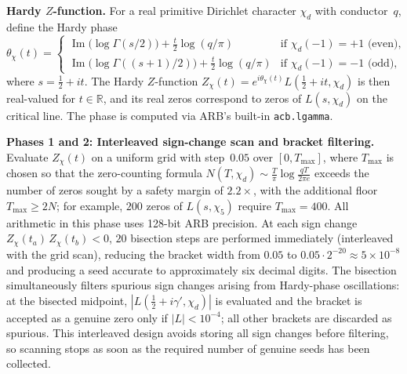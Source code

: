 \documentclass[12pt,reqno]{amsart}
\theoremstyle{plain}
\theoremstyle{definition}
\theoremstyle{remark}
\begin{document}
\medskip\noindent\textbf{Hardy $Z$-function.}  For a real primitive Dirichlet character $\chi_d$ with conductor~$q$, define the Hardy phase
\[
  \theta_\chi(t) =
  \begin{cases}
    \operatorname{Im}\!\bigl(\log\Gamma(s/2)\bigr) + \tfrac{t}{2}\log(q/\pi)
    & \text{if } \chi_d(-1) = +1 \text{ (even)}, \\[4pt]
    \operatorname{Im}\!\bigl(\log\Gamma((s{+}1)/2)\bigr) + \tfrac{t}{2}\log(q/\pi)
    & \text{if } \chi_d(-1) = -1 \text{ (odd)},
  \end{cases}
\]
where $s = \tfrac{1}{2} + it$.  The Hardy $Z$-function $Z_\chi(t) = e^{i\theta_\chi(t)} L(\tfrac{1}{2}+it, \chi_d)$ is then real-valued for $t \in \mathbb{R}$, and its real zeros correspond to zeros of $L(s, \chi_d)$ on the critical line.  The phase is computed via ARB's built-in \texttt{acb.lgamma}.

\medskip\noindent\textbf{Phases 1 and 2: Interleaved sign-change scan and bracket filtering.}  Evaluate $Z_\chi(t)$ on a uniform grid with step~$0.05$ over $[0, T_{\max}]$, where $T_{\max}$ is chosen so that the zero-counting formula $N(T, \chi_d) \sim \frac{T}{\pi}\log\frac{qT}{2\pi e}$ exceeds the number of zeros sought by a safety margin of $2.2\times$, with the additional floor $T_{\max} \geq 2N$; for example, $200$ zeros of $L(s,\chi_5)$ require $T_{\max} = 400$.  All arithmetic in this phase uses 128-bit ARB precision.  At each sign change $Z_\chi(t_a)\,Z_\chi(t_b) < 0$, $20$ bisection steps are performed immediately (interleaved with the grid scan), reducing the bracket width from $0.05$ to $0.05 \cdot 2^{-20} \approx 5 \times 10^{-8}$ and producing a seed accurate to approximately six decimal digits.  The bisection simultaneously filters spurious sign changes arising from Hardy-phase oscillations: at the bisected midpoint, $|L(\tfrac{1}{2}+i\gamma', \chi_d)|$ is evaluated and the bracket is accepted as a genuine zero only if $|L| < 10^{-4}$; all other brackets are discarded as spurious.  This interleaved design avoids storing all sign changes before filtering, so scanning stops as soon as the required number of genuine seeds has been collected.
\end{document}

